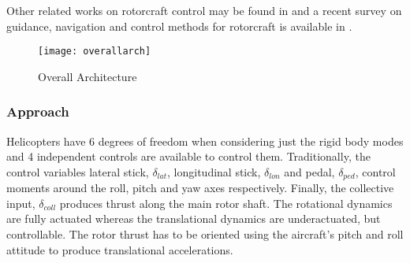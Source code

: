 Other related works on rotorcraft control may be found in \cite{kendoul:itr:2006,kendoul:jgcd:2007,kendoul:jfr:2010} and a recent survey on guidance, navigation and control methods for rotorcraft is available in \cite{kendoul:jfr:2012}.




\begin{figure}
  \centering\texttt{[image: overallarch]}
  \caption{Overall Architecture}
  \label{f:overallarch}
\end{figure}

\subsubsection*{Approach}
Helicopters have 6 degrees of freedom when considering just the rigid body modes and 4 independent controls are available to control them. Traditionally, the control variables lateral stick, $\delta_{lat}$, longitudinal stick, $\delta_{lon}$ and pedal, $\delta_{ped}$, control moments around the roll, pitch and yaw axes respectively. Finally, the collective input, $\delta_{coll}$ produces thrust along the main rotor shaft. The rotational dynamics are fully actuated whereas the translational dynamics are underactuated, but controllable. The rotor thrust has to be oriented using the aircraft's pitch and roll attitude to produce translational accelerations.

